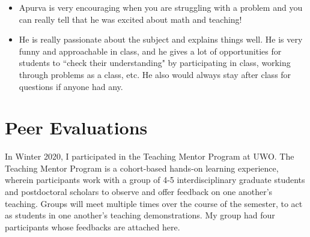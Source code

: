 \documentclass[
]{report}
\begin{document}
\begin{itemize}
  (like the other two), but there is a strong system of support from office hours and studying with MENU friends that makes the course
  doable.
\item
  Apurva is very encouraging when you are struggling with a problem and you can really tell that he was excited about math and
  teaching!\\
\item
  He is really passionate about the subject and explains things well. He is very funny and approachable in class, and he gives a lot of
  opportunities for students to ``check their understanding" by participating in class, working through problems as a class, etc. He
  also would always stay after class for questions if anyone had any.
\end{itemize}

\hypertarget{peer-evaluations}{%
\section{Peer Evaluations}\label{peer-evaluations}}

In Winter 2020, I participated in the Teaching Mentor Program at UWO.
The Teaching Mentor Program is a cohort-based hands-on learning experience, wherein participants
work with a group of 4-5 interdisciplinary graduate students and postdoctoral scholars to observe
and offer feedback on one another's teaching. Groups will meet multiple times over the course of
the semester, to act as students in one another's teaching demonstrations. My group had four
participants whose feedbacks are attached here.
\end{document}
